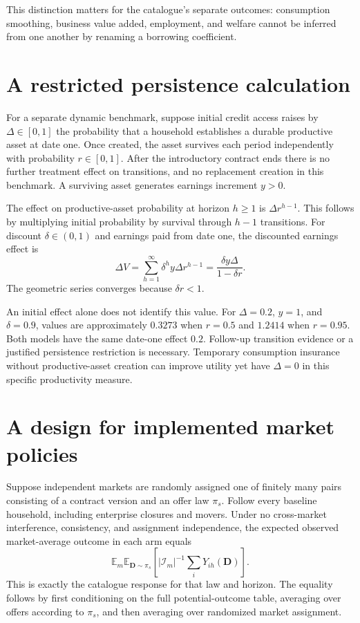 \documentclass[11pt,a4paper]{article}
\newcommand{\E}{\mathbb E}
\begin{document}
This distinction matters for the catalogue's separate outcomes: consumption smoothing, business value added, employment, and welfare cannot be inferred from one another by renaming a borrowing coefficient.
\section{A restricted persistence calculation}
For a separate dynamic benchmark, suppose initial credit access raises by $\Delta\in[0,1]$ the probability that a household establishes a durable productive asset at date one. Once created, the asset survives each period independently with probability $r\in[0,1]$. After the introductory contract ends there is no further treatment effect on transitions, and no replacement creation in this benchmark. A surviving asset generates earnings increment $y>0$.

The effect on productive-asset probability at horizon $h\ge1$ is
$\Delta r^{h-1}$. This follows by multiplying initial probability by survival through $h-1$ transitions. For discount $\delta\in(0,1)$ and earnings paid from date one, the discounted earnings effect is
\[
 \Delta V=\sum_{h=1}^{\infty}\delta^h y\Delta r^{h-1}
 =\frac{\delta y\Delta}{1-\delta r}.
 \tag{2}
\]
The geometric series converges because $\delta r<1$.

An initial effect alone does not identify this value. For $\Delta=0.2$, $y=1$, and $\delta=0.9$, values are approximately $0.3273$ when $r=0.5$ and $1.2414$ when $r=0.95$. Both models have the same date-one effect $0.2$. Follow-up transition evidence or a justified persistence restriction is necessary. Temporary consumption insurance without productive-asset creation can improve utility yet have $\Delta=0$ in this specific productivity measure.
\section{A design for implemented market policies}
Suppose independent markets are randomly assigned one of finitely many pairs consisting of a contract version and an offer law $\pi_s$. Follow every baseline household, including enterprise closures and movers. Under no cross-market interference, consistency, and assignment independence, the expected observed market-average outcome in each arm equals
\[
 \E_m\E_{\mathbf D\sim\pi_s}\left[
 |\mathcal I_m|^{-1}\sum_iY_{ih}(\mathbf D)\right].
\]
This is exactly the catalogue response for that law and horizon. The equality follows by first conditioning on the full potential-outcome table, averaging over offers according to $\pi_s$, and then averaging over randomized market assignment.
\end{document}
